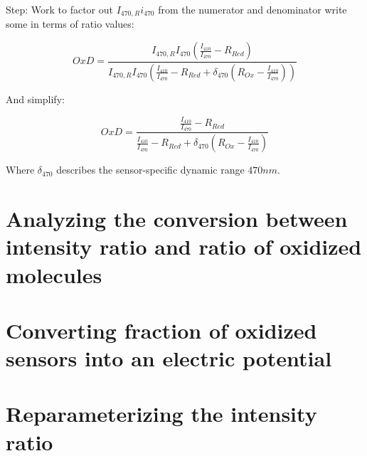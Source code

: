 \documentclass{article}
\begin{document}
Step: Work to factor out $I_{470, R}i_{470}$ from the numerator and denominator write some in terms of ratio values:

$$ OxD = \frac{I_{470, R}I_{470}(\frac{I_{410}}{I_{470}} - R_{Red})}{I_{470, R}I_{470}(\frac{I_{410}}{I_{470}}-R_{Red} + \delta_{470}(R_{Ox}-\frac{I_{410}}{I_{470}}))}  $$

And simplify:

\begin{equation}
OxD = \frac{\frac{I_{410}}{I_{470}} - R_{Red}}{\frac{I_{410}}{I_{470}}-R_{Red} + \delta_{470}(R_{Ox}-\frac{I_{410}}{I_{470}})} 
\end{equation}

Where $\delta_{470}$ describes the sensor-specific dynamic range $470nm$.

\section{Analyzing the conversion between intensity ratio and ratio of oxidized molecules}

\section{Converting fraction of oxidized sensors into an electric potential}


\section{Reparameterizing the intensity ratio}
\end{document}
